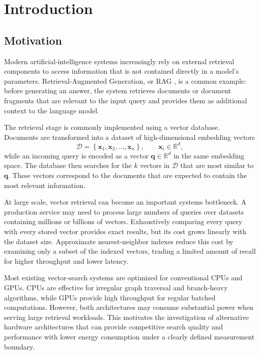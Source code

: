 \chapter{Introduction}
\label{chap:introduction}

\section{Motivation}

Modern artificial-intelligence systems increasingly rely on external retrieval components to access information that is not contained directly in a model's parameters. Retrieval-Augmented Generation, or RAG \cite{lewis_rag}, is a common example: before generating an answer, the system retrieves documents or document fragments that are relevant to the input query and provides them as additional context to the language model.

The retrieval stage is commonly implemented using a vector database. Documents are transformed into a dataset of high-dimensional embedding vectors
\begin{equation}
\mathcal{D}=\left\{\mathbf{x}_1,\mathbf{x}_2,\ldots,\mathbf{x}_n\right\}, \qquad \mathbf{x}_i\in\mathbb{R}^{d},
\end{equation}
while an incoming query is encoded as a vector \(\mathbf{q}\in\mathbb{R}^{d}\) in the same embedding space. The database then searches for the \(k\) vectors in \(\mathcal{D}\) that are most similar to \(\mathbf{q}\). These vectors correspond to the documents that are expected to contain the most relevant information.

At large scale, vector retrieval can become an important systems bottleneck. A production service may need to process large numbers of queries over datasets containing millions or billions of vectors. Exhaustively comparing every query with every stored vector provides exact results, but its cost grows linearly with the dataset size. Approximate nearest-neighbor indexes reduce this cost by examining only a subset of the indexed vectors, trading a limited amount of recall for higher throughput and lower latency.

Most existing vector-search systems are optimized for conventional CPUs and GPUs. CPUs are effective for irregular graph traversal and branch-heavy algorithms, while GPUs provide high throughput for regular batched computations. However, both architectures may consume substantial power when serving large retrieval workloads. This motivates the investigation of alternative hardware architectures that can provide competitive search quality and performance with lower energy consumption under a clearly defined measurement boundary.

